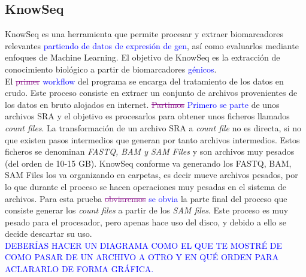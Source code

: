 \subsection{KnowSeq}\label{metodologia_knowseq}
KnowSeq es una herramienta que permite procesar y extraer biomarcadores relevantes \textcolor{blue}{partiendo de datos de expresión de gen}, así como evaluarlos mediante enfoques de Machine Learning. El objetivo de KnowSeq es la extracción de conocimiento biológico a partir de biomarcadores \textcolor{blue}{génicos}. \\

El \textcolor{purple}{\sout{primer}} \textcolor{blue}{workflow} del programa se encarga del tratamiento de los datos en crudo. Este proceso consiste en extraer un conjunto de archivos provenientes de los datos en bruto alojados en internet. \textcolor{purple}{\sout{Partimos}} \textcolor{blue}{Primero se parte} de unos archivos SRA y el objetivo es procesarlos para obtener unos ficheros llamados \textit{count files}. La transformación de un archivo SRA a \textit{count file} no es directa, si no que existen pasos intermedios que generan por tanto archivos intermedios. Estos ficheros se denominan \textit{FASTQ, BAM y SAM Files} y son archivos muy pesados (del orden de 10-15 GB). KnowSeq conforme va generando los FASTQ, BAM, SAM Files los va organizando en carpetas, es decir mueve archivos pesados, por lo que durante el proceso se hacen operaciones muy pesadas en el sistema de archivos. Para esta prueba \textcolor{purple}{\sout{obviaremos}} \textcolor{blue}{se obvia} la parte final del proceso que consiste generar los \textit{count files} a partir de los \textit{SAM files}. Este proceso es muy pesado para el procesador, pero apenas hace uso del disco, y debido a ello se decide descartar su uso.\\

\textcolor{blue}{DEBERÍAS HACER UN DIAGRAMA COMO EL QUE TE MOSTRÉ DE COMO PASAR DE UN ARCHIVO A OTRO Y EN QUÉ ORDEN PARA ACLARARLO DE FORMA GRÁFICA.}

